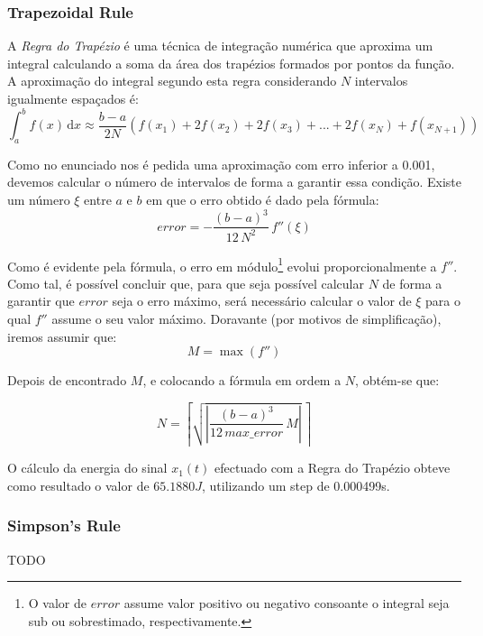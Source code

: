 \documentclass[a4paper]{article}
\begin{document}
\subsubsection{Trapezoidal Rule}
\noindent A \emph{Regra do Trapézio} é uma técnica de integração numérica que aproxima um integral calculando a soma da área dos trapézios formados por pontos da função. A aproximação do integral segundo esta regra considerando $N$ intervalos igualmente espaçados é:
\begin{equation}
\int_{a}^{b} f(x) \, \mathrm{d} x \approx \frac{b-a}{2N} (f(x_{1}) + 2 f(x_{2}) + 2 f(x_{3}) + ... + 2 f(x_{N}) + f(x_{N+1}))
\end{equation}

\noindent Como no enunciado nos é pedida uma aproximação com erro inferior a 0.001, devemos calcular o número de intervalos de forma a garantir essa condição. Existe um número $\xi$ entre $a$ e $b$ em que o erro obtido é dado pela fórmula:
\begin{equation}
error = -\frac{(b-a)^3}{12 \, N^2} \, f''(\xi)
\end{equation}

\noindent Como é evidente pela fórmula, o erro em módulo\footnote{O valor de $error$ assume valor positivo ou negativo consoante o integral seja sub ou sobrestimado, respectivamente.} evolui proporcionalmente a $f''$. Como tal, é possível concluir que, para que seja possível calcular $N$ de forma a garantir que $error$ seja o erro máximo, será necessário calcular o valor de $\xi$ para o qual $f''$ assume o seu valor máximo. Doravante (por motivos de simplificação), iremos assumir que:
\begin{equation}
M = \max(f'')
\end{equation}

\noindent Depois de encontrado $M$, e colocando a fórmula em ordem a $N$, obtém-se que:

\begin{equation}
N = \left\lceil \sqrt{\left| \frac{(b-a)^3}{12 \, max\_error} \, M \right|} \, \right\rceil
\end{equation}

O cálculo da energia do sinal $x_{1}(t)$ efectuado com a Regra do Trapézio obteve como resultado o valor de $65.1880 J$, utilizando um step de 0.000499s.

\subsubsection{Simpson's Rule}
\noindent TODO
\end{document}
